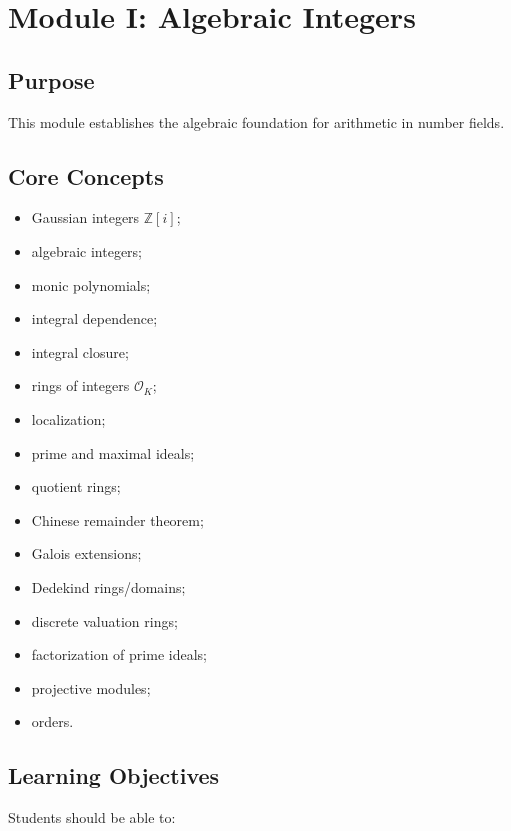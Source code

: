 \documentclass[11pt,a4paper]{article}
\newcommand{\Z}{\mathbb Z}
\newcommand{\OK}{\mathcal O_K}
\begin{document}
\section{Module I: Algebraic Integers}

\subsection{Purpose}

This module establishes the algebraic foundation for arithmetic in
number fields.

\subsection{Core Concepts}

\begin{itemize}
    \item Gaussian integers \(\Z[i]\);
    \item algebraic integers;
    \item monic polynomials;
    \item integral dependence;
    \item integral closure;
    \item rings of integers \(\OK\);
    \item localization;
    \item prime and maximal ideals;
    \item quotient rings;
    \item Chinese remainder theorem;
    \item Galois extensions;
    \item Dedekind rings/domains;
    \item discrete valuation rings;
    \item factorization of prime ideals;
    \item projective modules;
    \item orders.
\end{itemize}

\subsection{Learning Objectives}

Students should be able to:
\end{document}

